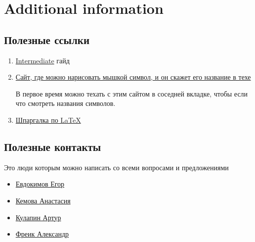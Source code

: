 \newpage
\section{Additional information}
\subsection{Полезные ссылки}

\begin{enumerate}
    \item \href{https://drive.google.com/file/d/1ItSd7wIKDC0uJiJ-Hifd1JO3MKASVVKl/view?usp=sharing}{Intermediate} гайд 
	\item \href{http://detexify.kirelabs.org/classify.html}{Сайт, где можно нарисовать мышкой символ, и он скажет его название в техе}
	
	В первое время можно техать с этим сайтом в соседней вкладке, чтобы если что смотреть названия символов.
	
	\item \href{http://wch.github.io/latexsheet/latexsheet.pdf}{Шпаргалка по \LaTeX}
\end{enumerate}

\subsection{Полезные контакты}
Это люди которым можно написать со всеми вопросами и предложениями
\begin{multicols}{2}
	\begin{itemize}
		\item \href{https://vk.com/ea_evdokimov}{Евдокимов Егор}
		\item \href{https://vk.com/tasyakemova}{Кемова Анастасия}
		\item \href{https://vk.com/kulart00}{Кулапин Артур}
		\item \href{https://vk.com/akira33333}{Фреик Александр}
	\end{itemize}
\end{multicols}
